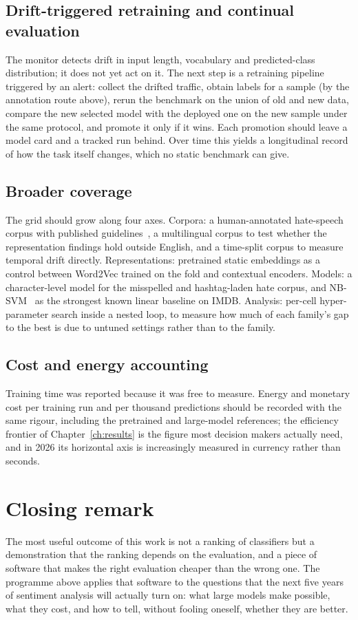 \subsection{Drift-triggered retraining and continual evaluation}
The monitor detects drift in input length, vocabulary and predicted-class distribution; it does not yet act on it. The next step is a retraining pipeline triggered by an alert: collect the drifted traffic, obtain labels for a sample (by the annotation route above), rerun the benchmark on the union of old and new data, compare the new selected model with the deployed one on the new sample under the same protocol, and promote it only if it wins. Each promotion should leave a model card and a tracked run behind. Over time this yields a longitudinal record of how the task itself changes, which no static benchmark can give.

\subsection{Broader coverage}
The grid should grow along four axes. Corpora: a human-annotated hate-speech corpus with published guidelines~\cite{davidson2017}, a multilingual corpus to test whether the representation findings hold outside English, and a time-split corpus to measure temporal drift directly. Representations: pretrained static embeddings as a control between Word2Vec trained on the fold and contextual encoders. Models: a character-level model for the misspelled and hashtag-laden hate corpus, and NB-SVM~\cite{wang2012} as the strongest known linear baseline on IMDB. Analysis: per-cell hyper-parameter search inside a nested loop, to measure how much of each family's gap to the best is due to untuned settings rather than to the family.

\subsection{Cost and energy accounting}
Training time was reported because it was free to measure. Energy and monetary cost per training run and per thousand predictions should be recorded with the same rigour, including the pretrained and large-model references; the efficiency frontier of Chapter~\ref{ch:results} is the figure most decision makers actually need, and in 2026 its horizontal axis is increasingly measured in currency rather than seconds.

\section{Closing remark}
The most useful outcome of this work is not a ranking of classifiers but a demonstration that the ranking depends on the evaluation, and a piece of software that makes the right evaluation cheaper than the wrong one. The programme above applies that software to the questions that the next five years of sentiment analysis will actually turn on: what large models make possible, what they cost, and how to tell, without fooling oneself, whether they are better.
